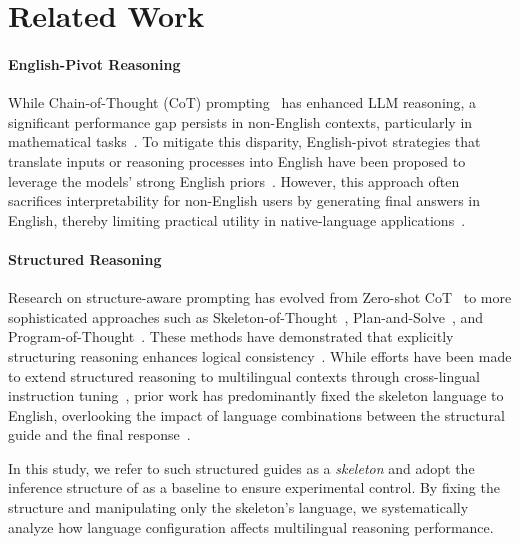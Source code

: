 \section{Related Work}
\paragraph{English-Pivot Reasoning}
While Chain-of-Thought (CoT) prompting~\citep{cot-neurips2022} has enhanced LLM reasoning, a significant performance gap persists in non-English contexts, particularly in mathematical tasks~\citep{shi2022language, mega-emnlp2023, wang2025polymath}. 
To mitigate this disparity, English-pivot strategies that translate inputs or reasoning processes into English have been proposed to leverage the models' strong English priors~\citep{clp-emnlp2023, xlt-emnlp2023, trans-allneed-2025naacl, etxaniz2024multilingual}. However, this approach often sacrifices interpretability for non-English users by generating final answers in English, thereby limiting practical utility in native-language applications~\citep{multilingual-prompting-emnlp2025,lee2025controlling,qi2025models}.

\paragraph{Structured Reasoning} 
Research on structure-aware prompting has evolved from Zero-shot CoT~\citep{kojima2022large} to more sophisticated approaches such as Skeleton-of-Thought~\citep{ning2023skeleton}, Plan-and-Solve~\citep{wang2023plan}, and Program-of-Thought~\citep{chen2022program}. These methods have demonstrated that explicitly structuring reasoning enhances logical consistency~\citep{zhou2022least,yao2023tree,khot2022decomposed}. While efforts have been made to extend structured reasoning to multilingual contexts through cross-lingual instruction tuning~\citep{chai2025xcot,lai2024mcot}, prior work has predominantly fixed the skeleton language to English, overlooking the impact of language combinations between the structural guide and the final response~\citep{qi2025sot,li2024eliciting}.

In this study, we refer to such structured guides as a \textit{skeleton} and adopt the inference structure of \citet{qi2025sot} as a baseline to ensure experimental control. By fixing the structure and manipulating only the skeleton's language, we systematically analyze how language configuration affects multilingual reasoning performance.

